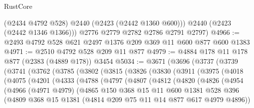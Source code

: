 \begin{lexlean}{RustCore}
\begin{coremodule}
          (@2434 @4792 @528)
          @2440
          (@2423 (@2442 @1360 @600)))
        @2440
        (@2423 (@2442 @1346 @1366)))
      @2776
      @2779
      @2782
      @2786
      @2791
      @2797)
@4966 := @2493 @4792 @528 @621 @2497 @1376 @209 @369 @11 @600 @877 @600 @1383
@4971 := @2510 @4792 @528 @209 @11 @877
@4979 := @4884 @178 @11 @178 @877 (@2383 (@4889 @178)) @3454
@5034 := @3671
    (@3696
      (@3737
        (@3739
          (@3741
            (@3762
              (@3785
                (@3802
                  (@3815
                    (@3826
                      (@3830
                        (@3911
                          (@3975
                            (@4018
                              (@4075
                                (@4201
                                  (@4333
                                    (@4788
                                      (@4797
                                        (@4807
                                          (@4812
                                            (@4820
                                              (@4826
                                                (@4954
                                                  (@4966
                                                    (@4971 @4979)
                                                    (@4865
                                                      @150
                                                      @368
                                                      @15
                                                      @11
                                                      @600
                                                      @1381
                                                      @528
                                                      @396
                                                      (@4809
                                                        @368
                                                        @15
                                                        @1381
                                                        (@4814
                                                          @209
                                                          @75
                                                          @11
                                                          @14
                                                          @877
                                                          @617
                                                          @4979
                                                          @4896))

\end{coremodule}
\end{lexlean}
